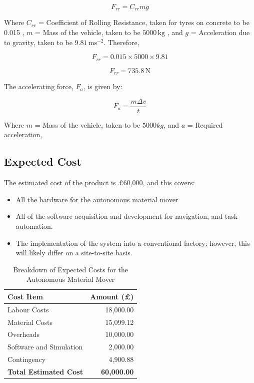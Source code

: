 \documentclass[12pt]{article}
\begin{document}
\begin{equation}
    F_{rr} = C_{rr} m g
\end{equation}



Where \( C_{rr} \) = Coefficient of Rolling Resistance, taken for tyres on concrete to be 0.015 \cite{RollingResistance}, \( m \) = Mass of the vehicle, taken to be \( 5000 \, \text{kg} \) \cite{VehicleMass}, and \( g \) = Acceleration due to gravity, taken to be \( 9.81 \, \text{ms}^{-2} \). Therefore,

\begin{equation}
    F_{rr} = 0.015 \times 5000 \times 9.81
\end{equation}

\begin{equation}
    F_{rr} = 735.8 \, \text{N}
\end{equation}

The accelerating force, \( F_a \), is given by:

\begin{equation}
    F_a = \frac{m \Delta v}{t}
\end{equation}


Where $m$ = Mass of the vehicle, taken to be $5000kg$, and $a$ = Required acceleration, 

\subsection{Expected Cost}

{The estimated cost of the product \cite{P. Hinz} is £60,000, and this covers:}
\begin{itemize}
    \item All the hardware for the autonomous material mover 
    \item All of the software acquisition and development for navigation,  and task automation.
    \item The implementation of the system into a conventional factory; however, this will likely differ on a site-to-site basis.
\end{itemize}

\begin{table}[h!]
    \centering
    \begin{tabular}{|l|r|}
        \hline
        \textbf{Cost Item}          & \textbf{Amount (£)} \\ \hline
        Labour Costs                 & 18,000.00           \\ \hline
        Material Costs              & 15,099.12           \\ \hline
        Overheads                   & 10,000.00           \\ \hline
        Software and Simulation     & 2,000.00            \\ \hline
        Contingency                 & 4,900.88            \\ \hline
        \textbf{Total Estimated Cost} & \textbf{60,000.00}  \\ \hline
    \end{tabular}
    \caption{Breakdown of Expected Costs for the Autonomous Material Mover}
    \label{tab:expected_costs}
\end{table}
\end{document}
